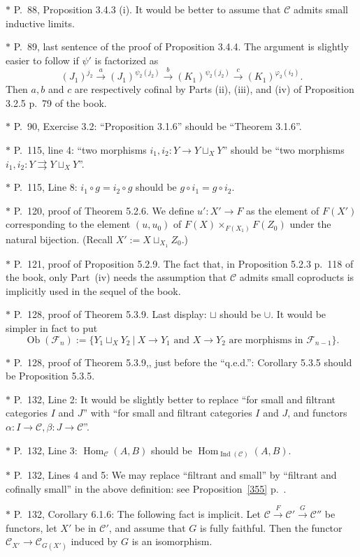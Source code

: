 \documentclass[12pt]{article}%
\theoremstyle{remark}
\theoremstyle{definition}
\newcommand{\nn}{\noindent}
\newcommand{\C}{\mathcal C}
\newcommand{\F}{\mathcal F}
\newcommand{\pp}{\varphi}
\newcommand{\parar}{\rightrightarrows}
\newcommand{\xr}{\xrightarrow}
\DeclareMathOperator{\Hom}{Hom}%
\DeclareMathOperator{\Ind}{Ind}
\DeclareMathOperator{\Ob}{Ob}
\begin{document}
\nn$*$ P.~88, Proposition 3.4.3 (i). It would be better to assume that $\C$ admits small inductive limits.

\nn$*$ P.~89, last sentence of the proof of Proposition 3.4.4. The argument is slightly easier to follow if $\psi'$ is factorized as 
$$
(J_1)^{j_2}\xr a(J_1)^{\psi_2(j_2)}\xr b(K_1)^{\psi_2(j_2)}\xr c(K_1)^{\pp_2(i_2)}.
$$ 
Then $a,b$ and $c$ are respectively cofinal by Parts (ii), (iii), and (iv) of Proposition 3.2.5 p.~79 of the book.

\nn$*$ P.~90, Exercise 3.2: ``Proposition 3.1.6'' should be ``Theorem 3.1.6''.

\nn$*$ P.~115, line 4: ``two morphisms $i_1,i_2:Y\to Y\sqcup_XY$'' should be ``two morphisms $i_1,i_2:Y\parar Y\sqcup_XY$''. 

\nn$*$ P.~115, Line 8: $i_1\circ g=i_2\circ g$ should be $g\circ i_1=g\circ i_2$.

\nn$*$ P.~120, proof of Theorem 5.2.6. We define $u':X'\to F$ as the element of $F(X')$ corresponding to the element $(u,u_0)$ of $F(X)\times_{F(X_1)}F(Z_0)$ under the natural bijection. (Recall $X':=X\sqcup_{X_1}Z_0$.)

\nn$*$ P.~121, proof of Proposition 5.2.9. The fact that, in Proposition 5.2.3 p.~118 of the book, only Part~(iv) needs the assumption that $\C$ admits small coproducts is implicitly used in the sequel of the book.

\nn$*$ P.~128, proof of Theorem 5.3.9. Last display: $\sqcup$ should be $\cup$. It would be simpler in fact to put 
$$
\Ob(\F_n):=\{Y_1\sqcup_XY_2\ |\ X\to Y_1\text{ and }X\to Y_2\text{ are morphisms in }\F_{n-1}\}.
$$ 

\nn$*$ P.~128, proof of Theorem 5.3.9,, just before the ``q.e.d.'': Corollary 5.3.5 should be Proposition 5.3.5.

\nn$*$ P.~132, Line 2: It would be slightly better to replace ``for small and filtrant categories $I$ and $J$'' with ``for small and filtrant categories $I$ and $J$, and functors $\alpha:I\to\C,\beta:J\to\C$''.

\nn$*$ P.~132, Line 3: $\Hom_\C(A,B)$ should be $\Hom_{\Ind(\C)}(A,B)$.

\nn$*$ P.~132, Lines 4 and 5: \guillemotleft We may replace ``filtrant and small'' by ``filtrant and cofinally small'' in the above definition\guillemotright: see Proposition~\ref{355} p.~\pageref{355}.

\nn$*$ P.~132, Corollary 6.1.6: The following fact is implicit. Let $\C\xrightarrow{F}\C'\xrightarrow{G}\C''$ be functors, let $X'$ be in $\C'$, and assume that $G$ is fully faithful. Then the functor $\C_{X'}\to\C_{G(X')}$ induced by $G$ is an isomorphism.
\end{document}

